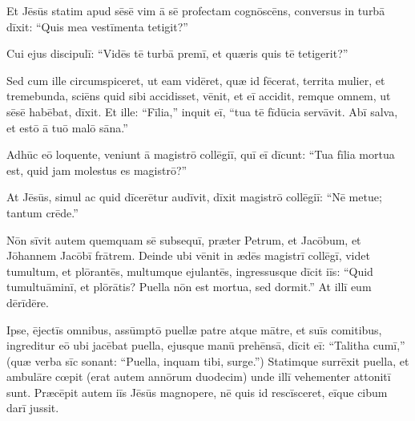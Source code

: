\Versus Et Jēsūs statim apud sēsē vim ā sē profectam cognōscēns, conversus in turbā dīxit: ``Quis mea vestīmenta tetigit?''

\Versus Cui ejus discipulī: ``Vidēs tē turbā premī, et quæris quis tē tetigerit?''

\Versus Sed cum ille circumspiceret, ut eam vidēret, quæ id fēcerat,
\Versus territa mulier, et tremebunda, sciēns quid sibi accidisset, vēnit, et eī accidit, remque omnem, ut sēsē habēbat, dīxit.
\Versus Et ille: ``Fīlia,'' inquit eī, ``tua tē fīdūcia servāvit. Abī salva, et estō ā tuō malō sāna.''

\Versus Adhūc eō loquente, veniunt ā magistrō collēgiī, quī eī dīcunt: ``Tua fīlia mortua est, quid jam molestus es magistrō?''

\Versus At Jēsūs, simul ac quid dīcerētur audīvit, dīxit magistrō collēgiī: ``Nē metue; tantum crēde.''

\Versus Nōn sīvit autem quemquam sē subsequī, præter Petrum, et Jacōbum, et Jōhannem Jacōbī frātrem.
\Versus Deinde ubi vēnit in ædēs magistrī collēgī, videt tumultum, et plōrantēs, multumque ejulantēs,
\Versus ingressusque dīcit iīs: ``Quid tumultuāminī, et plōrātis? Puella nōn est mortua, sed dormit.''
\Versus At illī eum dērīdēre.

Ipse, ējectīs omnibus, assūmptō puellæ patre atque mātre, et suīs comitibus, ingreditur eō ubi jacēbat puella,
\Versus ejusque manū prehēnsā, dīcit eī: ``Talitha cumī,'' (quæ verba sīc sonant: ``Puella, inquam tibi, surge.'')
\Versus Statimque surrēxit puella, et ambulāre cœpit (erat autem annōrum duodecim) unde illī vehementer attonitī sunt.
\Versus Præcēpit autem iīs Jēsūs magnopere, nē quis id rescīsceret, eīque cibum darī jussit.
